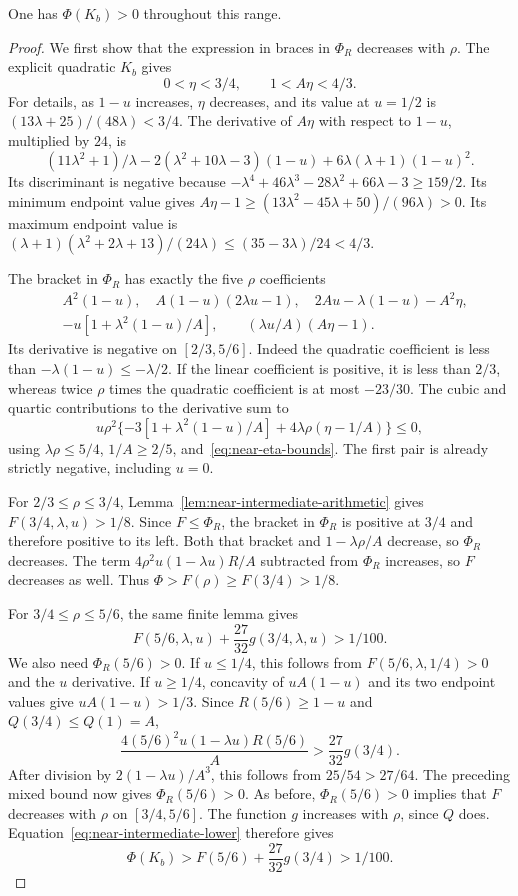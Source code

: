 \begin{lemma}\label{lem:near-intermediate-rho}
One has $\Phi(K_b)>0$ throughout this range.
\end{lemma}
\begin{proof}
We first show that the expression in braces in $\Phi_R$ decreases with $\rho$. The explicit quadratic $K_b$ gives
\begin{equation}\label{eq:near-eta-bounds}
 0<\eta<3/4,\qquad 1<A\eta<4/3.
\end{equation}
For details, as $1-u$ increases, $\eta$ decreases, and its value at $u=1/2$ is $(13\lambda+25)/(48\lambda)<3/4$. The derivative of $A\eta$ with respect to $1-u$, multiplied by $24$, is
\[
 (11\lambda^2+1)/\lambda
 -2(\lambda^2+10\lambda-3)(1-u)+6\lambda(\lambda+1)(1-u)^2.
\]
Its discriminant is negative because
$-\lambda^4+46\lambda^3-28\lambda^2+66\lambda-3\ge159/2$.
Its minimum endpoint value gives
$A\eta-1\ge(13\lambda^2-45\lambda+50)/(96\lambda)>0$.
Its maximum endpoint value is
$(\lambda+1)(\lambda^2+2\lambda+13)/(24\lambda)
\le(35-3\lambda)/24<4/3$.

The bracket in $\Phi_R$ has exactly the five $\rho$ coefficients
\[
\begin{split}
 &A^2(1-u),\quad A(1-u)(2\lambda u-1),\quad
 2Au-\lambda(1-u)-A^2\eta,\\
 &-u[1+\lambda^2(1-u)/A],\qquad
 (\lambda u/A)(A\eta-1).
\end{split}
\]
Its derivative is negative on $[2/3,5/6]$. Indeed the quadratic coefficient is less than $-\lambda(1-u)\le-\lambda/2$. If the linear coefficient is positive, it is less than $2/3$, whereas twice $\rho$ times the quadratic coefficient is at most $-23/30$. The cubic and quartic contributions to the derivative sum to
\[
 u\rho^2\{-3[1+\lambda^2(1-u)/A]+4\lambda\rho(\eta-1/A)\}\le0,
\]
using $\lambda\rho\le5/4$, $1/A\ge2/5$, and~\eqref{eq:near-eta-bounds}. The first pair is already strictly negative, including $u=0$.

For $2/3\le\rho\le3/4$, Lemma~\ref{lem:near-intermediate-arithmetic} gives $F(3/4,\lambda,u)>1/8$. Since $F\le\Phi_R$, the bracket in $\Phi_R$ is positive at $3/4$ and therefore positive to its left. Both that bracket and $1-\lambda\rho/A$ decrease, so $\Phi_R$ decreases. The term $4\rho^2u(1-\lambda u)R/A$ subtracted from $\Phi_R$ increases, so $F$ decreases as well. Thus
$\Phi>F(\rho)\ge F(3/4)>1/8$.

For $3/4\le\rho\le5/6$, the same finite lemma gives
\[
 F(5/6,\lambda,u)+\frac{27}{32}g(3/4,\lambda,u)>1/100.
\]
We also need $\Phi_R(5/6)>0$. If $u\le1/4$, this follows from $F(5/6,\lambda,1/4)>0$ and the $u$ derivative. If $u\ge1/4$, concavity of $uA(1-u)$ and its two endpoint values give $uA(1-u)>1/3$. Since $R(5/6)\ge1-u$ and $Q(3/4)\le Q(1)=A$,
\[
 \frac{4(5/6)^2u(1-\lambda u)R(5/6)}A
 >\frac{27}{32}g(3/4).
\]
After division by $2(1-\lambda u)/A^3$, this follows from $25/54>27/64$. The preceding mixed bound now gives $\Phi_R(5/6)>0$.
As before, $\Phi_R(5/6)>0$ implies that $F$ decreases with $\rho$ on $[3/4,5/6]$. The function $g$ increases with $\rho$, since $Q$ does. Equation~\eqref{eq:near-intermediate-lower} therefore gives
\[
 \Phi(K_b)>F(5/6)+\frac{27}{32}g(3/4)>1/100.
\]
\end{proof}

